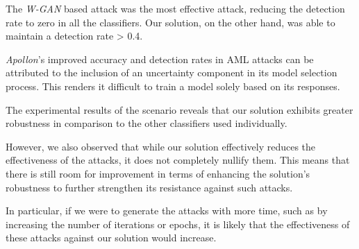 The \textit{W-GAN} based attack was the most effective attack, reducing the detection rate to zero in all the classifiers.
Our solution, on the other hand, was able to maintain a detection rate > 0.4.


\textit{Apollon}'s improved accuracy and detection rates in AML attacks can be attributed to the inclusion of an uncertainty
component in its model selection process.
This renders it difficult to train a model solely based on its responses.

The experimental results of the scenario reveals that our solution exhibits greater robustness in comparison to the
other classifiers used individually.

However, we also observed that while our solution effectively reduces the effectiveness of the attacks, it does not
completely nullify them.
This means that there is still room for improvement in terms of enhancing the solution's robustness to further strengthen
its resistance against such attacks.

In particular, if we were to generate the attacks with more time, such as by increasing the number of iterations or epochs,
it is likely that the effectiveness of these attacks against our solution would increase.
